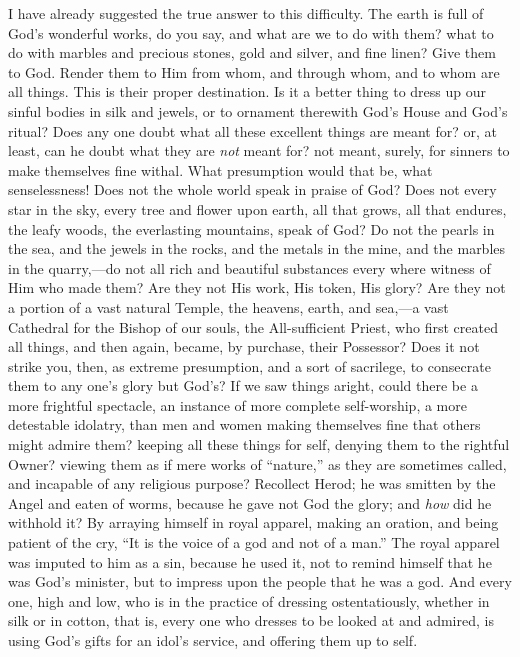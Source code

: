 I have already suggested the true answer to this difficulty. The
earth is full of God's wonderful works, do you say, and what are we to
do with them? what to do with marbles and precious stones, gold and
silver, and fine linen? Give them to God. Render them to Him from
whom, and through whom, and to whom are all things. This is their
proper destination. Is it a better thing to dress up our sinful bodies
in silk and jewels, or to ornament therewith God's House and God's
ritual? Does any one doubt what all these excellent things are meant
for? or, at least, can he doubt what they are \emph{not} meant for?
not meant, surely, for sinners to make themselves fine withal. What
presumption would that be, what senselessness! Does not the whole
world speak in praise of God? Does not every star in the sky, every
tree and flower upon earth, all that grows, all that endures, the
leafy woods, the everlasting mountains, speak of God? Do not the
pearls in the sea, and the jewels in the rocks, and the metals in the
mine, and the marbles in the quarry,—do not all rich and beautiful
substances every where witness of Him who made them? Are they not His
work, His token, His glory? Are they not a portion of a vast natural
Temple, the heavens, earth, and sea,—a vast Cathedral for the Bishop
of our souls, the All-sufficient Priest, who first created all things,
and then again, became, by purchase, their Possessor? Does it not
strike you, then, as extreme presumption, and a sort of sacrilege, to
consecrate them to any one's glory but God's? If we saw things aright,
could there be a more frightful spectacle, an instance of more
complete self-worship, a more detestable idolatry, than men and women
making themselves fine that others might admire them? keeping all
these things for self, denying them to the rightful Owner? viewing
them as if mere works of ``nature,'' as they are sometimes
called, and incapable of any religious purpose? Recollect Herod; he
was smitten by the Angel and eaten of worms, because he gave not God
the glory; and \emph{how} did he withhold it? By arraying himself in
royal apparel, making an oration, and being patient of the cry,
``It is the voice of a god and not of a man.'' The royal
apparel was imputed to him as a sin, because he used it, not to remind
himself that he was God's minister, but to impress upon the people
that he was a god. And every one, high and low, who is in the practice
of dressing ostentatiously, whether in silk or in cotton, that is,
every one who dresses to be looked at and admired, is using God's
gifts for an idol's service, and offering them up to self.

